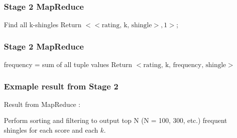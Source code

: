 \documentclass[11pt]{beamer}
\begin{document}
\begin{frame}
\frametitle{Stage 2 MapReduce}

\begin{tcolorbox}[
	colback=blue!5,
	colframe=blue!40!black,
	title=\textbf{Algorithm 2}: MapReduce (Mapper)
	]
\begin{algorithm}[H]
	{
		{
			\label{forins}
			Find all k-shingles\;
			{
				Return \(<<\mbox{rating, k, shingle}>, 1>\);
			}
 		}
	}
\end{algorithm}
\end{tcolorbox}

\end{frame}

\begin{frame}
\frametitle{Stage 2 MapReduce}

\begin{tcolorbox}[
	colback=blue!5,
	colframe=blue!30!black,
	title=\textbf{Algorithm 2}: MapReduce (Reducer)
	]
\begin{algorithm}[H]
	 {
		frequency = sum of all tuple values\;
		Return \(<\mbox{rating, k, frequency, shingle}>\)\;
	}
\end{algorithm}
\end{tcolorbox}

\end{frame}

\begin{frame}
\frametitle{Exmaple result from Stage 2}

Result from MapReduce : \\
\vspace{5mm}
\vspace{5mm}

Perform sorting and filtering to output top N (N = 100, 300, etc.) frequent shingles for each score and each \(k\).

\end{frame}
\end{document}
